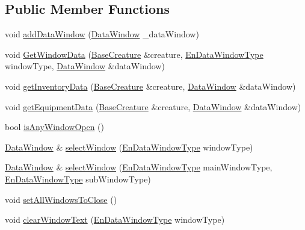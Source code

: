 \subsection*{Public Member Functions}
\begin{DoxyCompactItemize}
\item 
void \mbox{\hyperlink{class_window_commands_ace8d243ff05f6535d2c6fe5bff6e5517}{add\+Data\+Window}} (\mbox{\hyperlink{class_data_window}{Data\+Window}} \+\_\+data\+Window)
\item 
void \mbox{\hyperlink{class_window_commands_ab301c0f80a6c632ce5a858e6307feebd}{Get\+Window\+Data}} (\mbox{\hyperlink{class_base_creature}{Base\+Creature}} \&creature, \mbox{\hyperlink{_data_window_8hpp_a3c1e0c6fe947fdbea7502497b27cf44d}{En\+Data\+Window\+Type}} window\+Type, \mbox{\hyperlink{class_data_window}{Data\+Window}} \&data\+Window)
\item 
void \mbox{\hyperlink{class_window_commands_a1d8aea294ed36e2fc3fe061811b8513a}{get\+Inventory\+Data}} (\mbox{\hyperlink{class_base_creature}{Base\+Creature}} \&creature, \mbox{\hyperlink{class_data_window}{Data\+Window}} \&data\+Window)
\item 
void \mbox{\hyperlink{class_window_commands_a53ed484ce3096298bc7260c02015f5aa}{get\+Equipment\+Data}} (\mbox{\hyperlink{class_base_creature}{Base\+Creature}} \&creature, \mbox{\hyperlink{class_data_window}{Data\+Window}} \&data\+Window)
\item 
bool \mbox{\hyperlink{class_window_commands_a3a551cd38ac62e1644cef2f95d748bdd}{is\+Any\+Window\+Open}} ()
\item 
\mbox{\hyperlink{class_data_window}{Data\+Window}} \& \mbox{\hyperlink{class_window_commands_a4a688b109ea4eff83b5ae43bb1f93e50}{select\+Window}} (\mbox{\hyperlink{_data_window_8hpp_a3c1e0c6fe947fdbea7502497b27cf44d}{En\+Data\+Window\+Type}} window\+Type)
\item 
\mbox{\hyperlink{class_data_window}{Data\+Window}} \& \mbox{\hyperlink{class_window_commands_a0e61beaebffb12c489ee277b84f74248}{select\+Window}} (\mbox{\hyperlink{_data_window_8hpp_a3c1e0c6fe947fdbea7502497b27cf44d}{En\+Data\+Window\+Type}} main\+Window\+Type, \mbox{\hyperlink{_data_window_8hpp_a3c1e0c6fe947fdbea7502497b27cf44d}{En\+Data\+Window\+Type}} sub\+Window\+Type)
\item 
void \mbox{\hyperlink{class_window_commands_ac52c784736000a50d4d8ab43e0255f71}{set\+All\+Windows\+To\+Close}} ()
\item 
void \mbox{\hyperlink{class_window_commands_a74006a8f056f99594930592069c36604}{clear\+Window\+Text}} (\mbox{\hyperlink{_data_window_8hpp_a3c1e0c6fe947fdbea7502497b27cf44d}{En\+Data\+Window\+Type}} window\+Type)

\end{DoxyCompactItemize}
